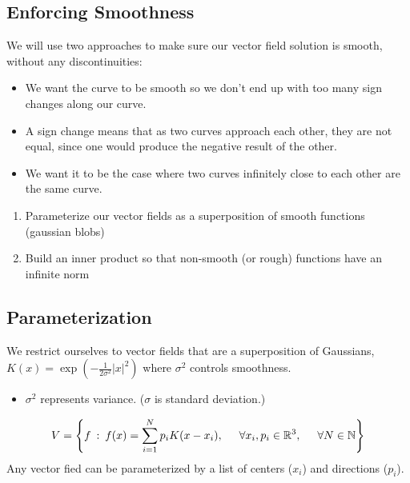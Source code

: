 \documentclass[10pt]{article}
\begin{document}
\subsection*{Enforcing Smoothness}
We will use two approaches to make sure our vector field solution is smooth, without any discontinuities:
\begin{itemize}
    \item We want the curve to be smooth so we don't end up with too many sign changes along our curve.
    \item A sign change means that as two curves approach each other, they are not equal, since one would produce the negative result of the other.
    \item We want it to be the case where two curves infinitely close to each other are the same curve.
\end{itemize}
\begin{enumerate}
    \item Parameterize our vector fields as a superposition of smooth functions (gaussian blobs)
    \item Build an inner product so that non-smooth (or rough) functions have an infinite norm
\end{enumerate}

\subsection*{Parameterization}
We restrict ourselves to vector fields that are a superposition of Gaussians, $K(x) = \exp(-\frac{1}{2\sigma^2} |x|^2)$ where $\sigma^2$ controls smoothness.
\begin{itemize}
    \item $\sigma^2$ represents variance.  ($\sigma$ is standard deviation.)
\end{itemize}
\[V = \left\{ f \::\: f(x) = \sum_{i = 1}^N p_i K(x - x_i), \hspace{0.5cm} \forall x_i, p_i \in \mathbb{R}^3, \hspace{0.5cm} \forall N \in \mathbb{N}\right\}\]
Any vector fied can be parameterized by a list of centers ($x_i$) and directions ($p_i$).
\end{document}
